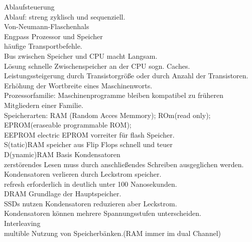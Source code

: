 \documentclass{article}
\begin{document}
	Ablaufsteuerung \\
	Ablauf: streng zyklisch und sequenziell. \\
	Von-Neumann-Flaschenhals \\
	Engpass Prozessor und Speicher \\
	häufige Transportbefehle. \\
	Bus zwischen Speicher und CPU macht Langsam. \\
	Lösung schnelle Zwischenspeicher an der CPU sogn. Caches. \\
	Leistungssteigerung durch Transistorgröße oder durch Anzahl der Transistoren. \\
	Erhöhung der Wortbreite eines Maschinenworts. \\
	Prozessorfamilie: Maschinenprogramme bleiben kompatibel zu früheren Mitgliedern einer Familie. \\
	Speicherarten: RAM (Random Acces Memmory); ROm(read only); EPROM(eraseable programmable ROM); \\
	EEPROM electric EPROM vorreiter für flash Speicher. \\
	S(tatic)RAM speicher aus Flip Flops schnell und teuer \\
	D(ynamic)RAM Basis Kondensatoren \\
	zerstörendes Lesen muss durch anschließendes Schreiben ausgeglichen werden. \\
	Kondensatoren verlieren durch Leckstrom speicher. \\
	refresh erforderlich in deutlich unter 100 Nanosekunden. \\
	DRAM Grundlage der Hauptspeicher. \\
	SSDs nutzen Kondensatoren reduzieren aber Leckstrom. \\
	Kondensatoren können mehrere Spannungsstufen unterscheiden. \\
	Interleaving \\
	multible Nutzung von Speicherbänken.(RAM immer im dual Channel) \\
\end{document}
